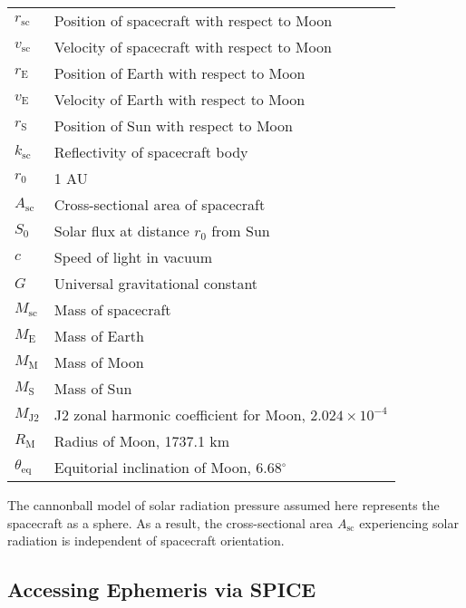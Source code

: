 \documentclass[12pt,letterpaper]{article}
\newcommand{\rsc}{r_{\scriptscriptstyle\text{sc}}}
\newcommand{\vsc}{v_{\scriptscriptstyle\text{sc}}}
\newcommand{\rE}{r_{\scriptscriptstyle\text{E}}}
\newcommand{\rS}{r_{\scriptscriptstyle \text{S}}}
\newcommand{\vE}{v_{\scriptscriptstyle \text{E}}}
\newcommand{\ME}{M_{\scriptscriptstyle \text{E}}}
\newcommand{\MM}{M_{\scriptscriptstyle \text{M}}}
\newcommand{\MS}{M_{\scriptscriptstyle \text{S}}}
\newcommand{\RM}{R_{\scriptscriptstyle \text{M}}}
\newcommand{\MJtwo}{M_{\scriptscriptstyle \text{J2}}}
\newcommand{\thteq}{\theta_{\text{eq}}}
\newcommand{\ksc}{k_{\scriptscriptstyle\text{sc}}}
\newcommand{\Msc}{M_{\scriptscriptstyle\text{sc}}}
\newcommand{\Asc}{A_{\scriptscriptstyle\text{sc}}}
\begin{document}
\begin{table}[!htpb]
\centering
\begin{tabular}{l|l}
\hline
 $\rsc$ & Position of spacecraft with respect to Moon\\   
 $\vsc$ & Velocity of spacecraft with respect to Moon\\
 $\rE$  & Position of Earth with respect to Moon\\
 $\vE$  & Velocity of Earth with respect to Moon\\
 $\rS$  & Position of Sun with respect to Moon\\
 $\ksc$ & Reflectivity of spacecraft body\\ 
 $r_0$  & 1 AU\\
 $\Asc$ & Cross-sectional area of spacecraft\\   
 $S_0$  & Solar flux at distance $r_0$ from Sun\\
 $c$    & Speed of light in vacuum\\
 $G$    & Universal gravitational constant\\
 $\Msc$ & Mass of spacecraft\\
 $\ME$  & Mass of Earth\\
 $\MM$  & Mass of Moon\\
 $\MS$  & Mass of Sun\\
 $\MJtwo$ & J2 zonal harmonic coefficient for Moon, $2.024\times 10^{-4}$\\
 $\RM$    & Radius of Moon, 1737.1 km\\
 $\thteq$ & Equitorial inclination of Moon, 6.68$^\circ$\\
\hline
\end{tabular}
\end{table}

The cannonball model of solar radiation pressure assumed here represents the spacecraft as a sphere. As a result, the cross-sectional area $\Asc$ experiencing solar radiation is independent of spacecraft orientation.


\subsection*{Accessing Ephemeris via SPICE}
\end{document}
